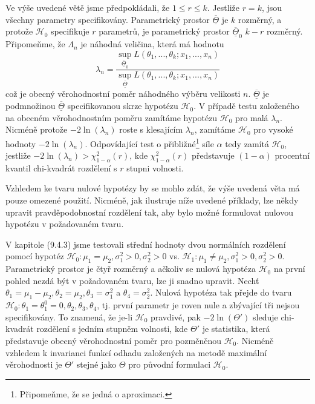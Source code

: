 Ve výše uvedené větě jsme předpokládali, že $1 \le r \le k$. Jestliže $r = k$, jsou všechny parametry specifikovány. Parametrický prostor $\overline{\underline{\Theta}}$ je $k$ rozměrný, a protože $\mathscr{H}_0$ specifikuje $r$ parametrů, je parametrický prostor $\overline{\underline{\Theta}}_0$ $k - r$ rozměrný. Připomeňme, že $\Lambda_n$ je náhodná veličina, která má hodnotu
\begin{equation*}
\lambda_n = \frac{\sup_{\overline{\underline{\Theta}}_0}L(\theta_1, ..., \theta_k; x_1, ..., x_n)}{\sup_{\overline{\underline{\Theta}}}L(\theta_1, ..., \theta_k; x_1, ..., x_n)}
\end{equation*}
což je obecný věrohodnostní poměr náhodného výběru velikosti $n$. $\overline{\underline{\Theta}}$ je podmnožinou $\overline{\underline{\Theta}}$ specifikovanou skrze hypotézu $\mathscr{H}_0$. V případě testu založeného na obecném věrohodnostním poměru zamítáme hypotézu $\mathscr{H}_0$ pro malá $\lambda_n$. Nicméně protože $-2 \ln(\lambda_n)$ roste s klesajícím $\lambda_n$, zamítáme $\mathscr{H}_0$ pro vysoké hodnoty $-2 \ln(\lambda_n)$. Odpovídající test o přibližné\footnote{Připomeňme, že se jedná o aproximaci.} síle $\alpha$ tedy zamítá $\mathscr{H}_0$, jestliže $-2 \ln(\lambda_n) > \chi_{1 - \alpha}^2(r)$, kde $\chi_{1 - \alpha}^2(r)$ představuje $(1 - \alpha)$ procentní kvantil chi-kvadrát rozdělení s $r$ stupni volnosti.

Vzhledem ke tvaru nulové hypotézy by se mohlo zdát, že výše uvedená věta má pouze omezené použití. Nicméně, jak ilustruje níže uvedené příklady, lze někdy upravit pravděpodobnostní rozdělení tak, aby bylo možné formulovat nulovou hypotézu v požadovaném tvaru.

\begin{example}
V kapitole (9.4.3) jsme testovali střední hodnoty dvou normálních rozdělení pomocí hypotéz $\mathscr{H}_0: \mu_1 = \mu_2, \sigma_1^2 > 0, \sigma_2^2 > 0$ vs. $\mathscr{H}_1: \mu_1 \neq \mu_2, \sigma_1^2 > 0, \sigma_2^2 > 0$. Parametrický prostor je čtyř rozměrný a ačkoliv se nulová hypotéza $\mathscr{H}_0$ na první pohled nezdá být v požadovaném tvaru, lze ji snadno upravit. Nechť $\theta_1 = \mu_1 - \mu_2, \theta_2 = \mu_2, \theta_3 = \sigma_1^2$ a $\theta_4 = \sigma_2^2$. Nulová hypotéza tak přejde do tvaru $\mathscr{H}_0: \theta_1 = \theta_1^0 = 0, \theta_2, \theta_3, \theta_4$, tj. první parametr je roven nule a zbývající tři nejsou specifikovány. To znamená, že je-li $\mathscr{H}_0$ pravdivé, pak $-2 \ln(\Theta')$ sleduje chi-kvadrát rozdělení s jedním stupněm volnosti, kde $\Theta'$ je statistika, která představuje obecný věrohodnostní poměr pro pozměněnou $\mathscr{H}_0$. Nicméně vzhledem k invarianci funkcí odhadu založených na metodě maximální věrohodnosti je $\Theta'$ stejné jako $\Theta$ pro původní formulaci $\mathscr{H}_0$.
\end{example}

